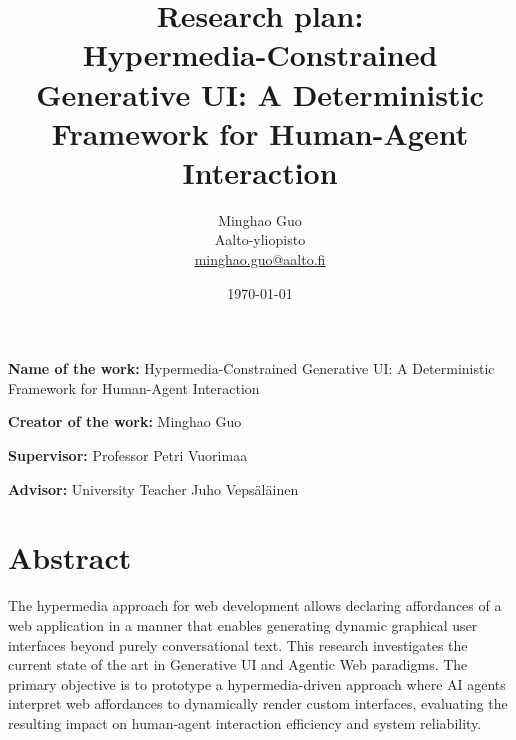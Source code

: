 \documentclass[12pt,a4paper,english,oneside]{article}
\begin{document}

\title{Research plan:\\[5mm]
Hypermedia-Constrained Generative UI: A Deterministic Framework for Human-Agent Interaction
% 
}

\author{Minghao Guo\\
Aalto-yliopisto\\
\url{minghao.guo@aalto.fi}}

\date{\today}

\maketitle



\vspace{10mm}

%

\textbf{Name of the work:} Hypermedia-Constrained Generative UI: A Deterministic Framework for Human-Agent Interaction 

\textbf{Creator of the work:} Minghao Guo

\textbf{Supervisor:} Professor Petri Vuorimaa

\textbf{Advisor:} University Teacher Juho Vepsäläinen

\section{Abstract}


The hypermedia approach for web development allows declaring affordances of a web application in a manner that enables generating dynamic graphical user interfaces beyond purely conversational text. This research investigates the current state of the art in Generative UI and Agentic Web paradigms. The primary objective is to prototype a hypermedia-driven approach where AI agents interpret web affordances to dynamically render custom interfaces, evaluating the resulting impact on human-agent interaction efficiency and system reliability.
\end{document}
